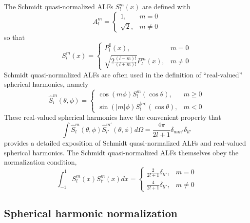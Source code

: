 \documentclass[12pt]{article}
\begin{document}
The Schmidt quasi-normalized ALFs $S_l^m(x)$ are defined with
\begin{equation}
A_l^m = \left\{
\begin{array}{cc}
1, & m = 0 \\
\sqrt{2}, & m \neq 0
\end{array}
\right.
\end{equation}
so that
\begin{equation}
S_l^m(x) = \left\{
\begin{array}{cc}
P_l^0(x), & m = 0 \\
\sqrt{2 \frac{(l-m)!}{(l+m)!}} P_l^m(x), & m \neq 0
\end{array}
\right.
\end{equation}
Schmidt quasi-normalized ALFs are often used in the definition of
``real-valued'' spherical harmonics, namely
\begin{equation}
\hat{S}_l^m(\theta,\phi) = \left\{
\begin{array}{cc}
\cos{(m \phi)} S_l^m(\cos{\theta}), & m \geq 0 \\
\sin{(|m| \phi)} S_l^{|m|}(\cos{\theta}), & m < 0
\end{array}
\right.
\end{equation}
These real-valued spherical harmonics have the convenient property
that
\begin{equation}
\int \hat{S}_l^m(\theta,\phi) \hat{S}_{l'}^{m'}(\theta,\phi) d\Omega = \frac{4\pi}{2l+1} \delta_{mm'} \delta_{ll'}
\end{equation}
\citet{winch2005} provides a detailed exposition of Schmidt quasi-normalized
ALFs and real-valued spherical harmonics. The Schmidt
quasi-normalized ALFs themselves obey the normalization condition,
\begin{equation}
\int_{-1}^1 S_l^m(x) S_{l'}^m(x) dx = \left\{
\begin{array}{cc}
\frac{2}{2l+1} \delta_{ll'}, & m = 0 \\
\frac{4}{2l+1} \delta_{ll'}, & m \neq 0
\end{array}
\right.
\end{equation}

\subsection{Spherical harmonic normalization}
\end{document}
